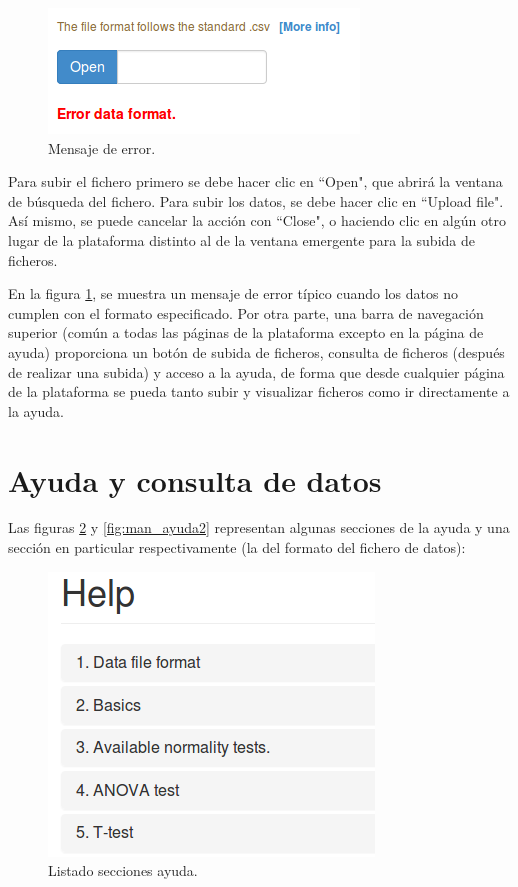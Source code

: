 \begin{figure}[H]
\centering
\includegraphics[scale=0.5]{figuras/man_fichero2.png}
\caption{Mensaje de error.}
\label{fig:man_fichero2}
\end{figure}

Para subir el fichero primero se debe hacer clic en ``Open", que abrirá la ventana de búsqueda del fichero. Para subir los datos, se debe hacer clic en ``Upload file". Así mismo, se puede cancelar la acción con ``Close", o haciendo clic en algún otro lugar de la plataforma distinto al de la ventana emergente para la subida de ficheros.

En la figura \ref{fig:man_fichero2}, se muestra un mensaje de error típico cuando los datos no cumplen con el formato especificado. Por otra parte, una barra de navegación superior (común a todas las páginas de la plataforma excepto en la página de ayuda) proporciona un botón de subida de ficheros, consulta de ficheros (después de realizar una subida) y acceso a la ayuda, de forma que desde cualquier página de la plataforma se pueda tanto subir y visualizar ficheros como ir directamente a la ayuda.

\section{Ayuda y consulta de datos}

Las figuras \ref{fig:man_ayuda1} y \ref{fig:man_ayuda2} representan algunas secciones de la ayuda y una sección en particular respectivamente (la del formato del fichero de datos):

\begin{figure}[H]
\centering
\includegraphics[scale=0.5]{figuras/man_ayuda1.png}
\caption{Listado secciones ayuda.}
\label{fig:man_ayuda1}
\end{figure}

